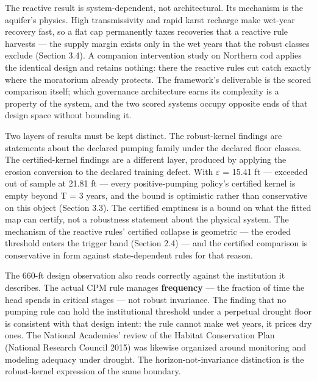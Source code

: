 \documentclass[11pt]{article}
\begin{document}
The reactive result is system-dependent, not architectural. Its
mechanism is the aquifer's physics. High transmissivity and rapid karst
recharge make wet-year recovery fast, so a flat cap permanently taxes
recoveries that a reactive rule harvests --- the supply margin exists
only in the wet years that the robust classes exclude (Section 3.4). A
companion intervention study on Northern cod applies the identical
design and retains nothing: there the reactive rules cut catch exactly
where the moratorium already protects. The framework's deliverable is
the scored comparison itself; which governance architecture earns its
complexity is a property of the system, and the two scored systems
occupy opposite ends of that design space without bounding it.

Two layers of results must be kept distinct. The robust-kernel findings
are statements about the declared pumping family under the declared
floor classes. The certified-kernel findings are a different layer,
produced by applying the erosion conversion to the declared training
defect. With \ensuremath{\varepsilon} = 15.41 ft --- exceeded out of sample at 21.81 ft ---
every positive-pumping policy's certified kernel is empty beyond T = 3
years, and the bound is optimistic rather than conservative on this
object (Section 3.3). The certified emptiness is a bound on what the
fitted map can certify, not a robustness statement about the physical
system. The mechanism of the reactive rules' certified collapse is
geometric --- the eroded threshold enters the trigger band (Section 2.4)
--- and the certified comparison is conservative in form against
state-dependent rules for that reason.

The 660-ft design observation also reads correctly against the
institution it describes. The actual CPM rule manages \textbf{frequency}
--- the fraction of time the head spends in critical stages --- not
robust invariance. The finding that no pumping rule can hold the
institutional threshold under a perpetual drought floor is consistent
with that design intent: the rule cannot make wet years, it prices dry
ones. The National Academies' review of the Habitat Conservation Plan
(National Research Council 2015) was likewise organized around
monitoring and modeling adequacy under drought. The
horizon-not-invariance distinction is the robust-kernel expression of
the same boundary.
\end{document}
